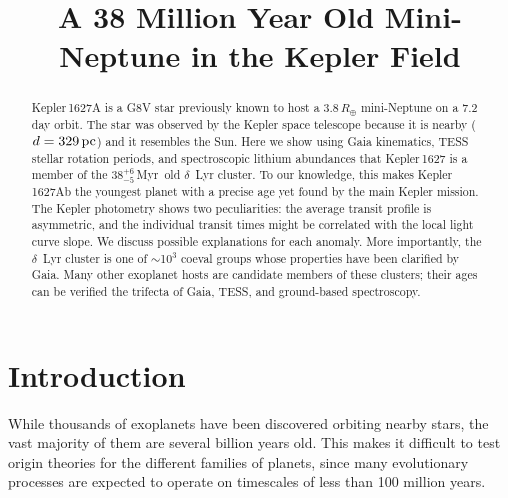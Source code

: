 \documentclass[12pt,modern,twocolumn,tighten,linenumbers,trackchanges]{aastex63}
\newcommand{\clusterage}{$38^{+6}_{-5}$\,Myr} %
\begin{document}
\title{
  A 38 Million Year Old Mini-Neptune in the Kepler Field
}



\begin{abstract}
  Kepler\,1627A is a G8V star previously known to host a
  $3.8\,R_\oplus$ mini-Neptune on a 7.2\,day orbit.  The star was
  observed by the Kepler space telescope because it is nearby
  ($d=329\,{\rm pc}$) and it resembles the Sun.  Here we show using
  Gaia kinematics, TESS stellar rotation periods, and spectroscopic
  lithium abundances that Kepler\,1627 is a member of the \clusterage\
  old $\delta$~Lyr cluster.  To our knowledge, this makes
  Kepler\,1627Ab the youngest planet with a precise age yet found by
  the main Kepler mission.  The Kepler photometry shows two
  peculiarities: the average transit profile is asymmetric, and the
  individual transit times might be correlated with the local light curve
  slope.  We discuss possible explanations for each anomaly.  More
  importantly, the $\delta$~Lyr cluster
  is one of $\sim$10$^3$ coeval groups whose properties have been clarified
  by Gaia.  Many other exoplanet hosts are candidate members
  of these clusters; their ages can be verified  the
  trifecta of Gaia, TESS, and ground-based spectroscopy.
\end{abstract}




\section{Introduction}

While thousands of exoplanets have been discovered orbiting nearby
stars, the vast majority of them are several billion years old.  This
makes it difficult to test origin theories for the different families
of planets, since many evolutionary processes are expected to operate
on timescales of less than 100 million years.
\end{document}
